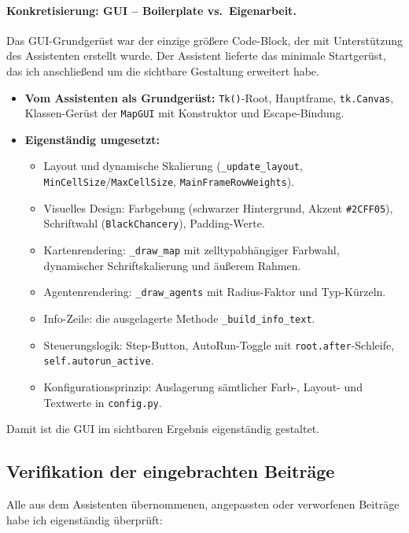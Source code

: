 \paragraph{Konkretisierung: \acs{GUI} -- Boilerplate vs.\ Eigenarbeit.}
Das \acs{GUI}-Grundgerüst war der einzige größere Code-Block, der mit Unterstützung des Assistenten erstellt wurde. Der Assistent lieferte das minimale Startgerüst, das ich anschließend um die sichtbare Gestaltung erweitert habe.

\begin{itemize}
    \item \textbf{Vom Assistenten als Grundgerüst:} \texttt{Tk()}-Root, Hauptframe, \texttt{tk.Canvas}, Klassen-Gerüst der \texttt{MapGUI} mit Konstruktor und Escape-Bindung.
    \item \textbf{Eigenständig umgesetzt:}
    \begin{itemize}
        \item Layout und dynamische Skalierung (\texttt{\_update\_layout}, \texttt{MinCellSize}/\texttt{MaxCellSize}, \texttt{MainFrameRowWeights}).
        \item Visuelles Design: Farbgebung (schwarzer Hintergrund, Akzent \texttt{\#2CFF05}), Schriftwahl (\texttt{BlackChancery}), Padding-Werte.
        \item Kartenrendering: \texttt{\_draw\_map} mit zelltypabhängiger Farbwahl, dynamischer Schriftskalierung und äußerem Rahmen.
        \item Agentenrendering: \texttt{\_draw\_agents} mit Radius-Faktor und Typ-Kürzeln.
        \item Info-Zeile: die ausgelagerte Methode \texttt{\_build\_info\_text}.
        \item Steuerungslogik: Step-Button, AutoRun-Toggle mit \texttt{root.after}-Schleife, \texttt{self.autorun\_active}.
        \item Konfigurationsprinzip: Auslagerung sämtlicher Farb-, Layout- und Textwerte in \texttt{config.py}.
    \end{itemize}
\end{itemize}

Damit ist die \acs{GUI} im sichtbaren Ergebnis eigenständig gestaltet.

\subsection{Verifikation der eingebrachten Beiträge}

Alle aus dem Assistenten übernommenen, angepassten oder verworfenen Beiträge habe ich eigenständig überprüft:

